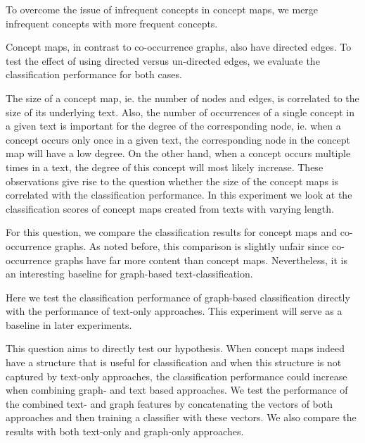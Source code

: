 To overcome the issue of infrequent concepts in concept maps, we merge infrequent concepts with more frequent concepts.

Concept maps, in contrast to co-occurrence graphs, also have directed edges.
To test the effect of using directed versus un-directed edges, we evaluate the classification performance for both cases.

The size of a concept map, ie. the number of nodes and edges, is correlated to the size of its underlying text.
Also, the number of occurrences of a single concept in a given text is important for the degree of the corresponding node, ie. when a concept occurs only once in a given text, the corresponding node in the concept map will have a low degree.
On the other hand, when a concept occurs multiple times in a text, the degree of this concept will most likely increase.
These observations give rise to the question whether the size of the concept maps is correlated with the classification performance.
In this experiment we look at the classification scores of concept maps created from texts with varying length.

For this question, we compare the classification results for concept maps and co-occurrence graphs. As noted before, this comparison is slightly unfair since co-occurrence graphs have far more content than concept maps.
Nevertheless, it is an interesting baseline for graph-based text-classification.

Here we test the classification performance of graph-based classification directly with the performance of text-only approaches.
This experiment will serve as a baseline in later experiments.

This question aims to directly test our hypothesis. 
When concept maps indeed have a structure that is useful for classification and when this structure is not captured by text-only approaches, the classification performance could increase when combining graph- and text based approaches.
We test the performance of the combined text- and graph features by concatenating the vectors of both approaches and then training a classifier with these vectors.
We also compare the results with both text-only and graph-only approaches.

